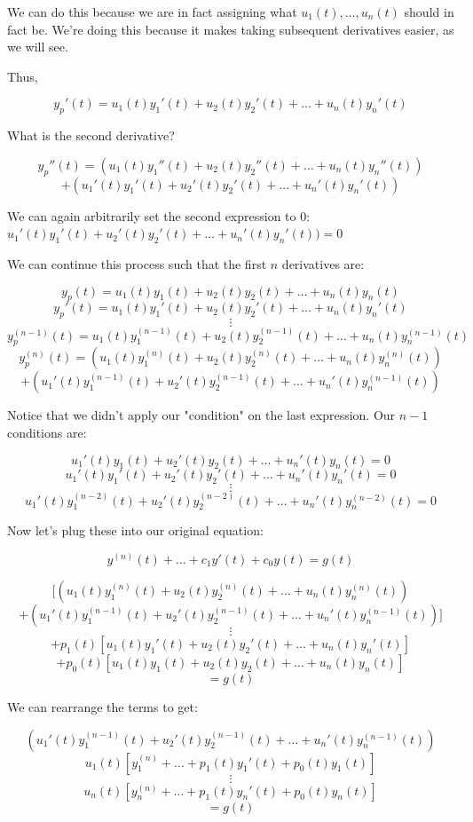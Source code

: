 \documentclass{report}
\begin{document}
We can do this because we are in fact assigning what $u_1(t), \dots, u_n(t)$ should in fact be. We're doing this because it makes taking subsequent derivatives easier, as we will see.

Thus,

$$y_p'(t) = u_1(t)y_1'(t) + u_2(t)y_2'(t) + \dots + u_n(t)y_n'(t)$$

What is the second derivative?

$$y_p''(t) = (u_1(t)y_1''(t) + u_2(t)y_2''(t) + \dots + u_n(t)y_n''(t))$$ 
$$ +  (u_1'(t)y_1'(t) + u_2'(t)y_2'(t) + \dots + u_n'(t)y_n'(t))$$

We can again arbitrarily set the second expression to 0:
$u_1'(t)y_1'(t) + u_2'(t)y_2'(t) + \dots + u_n'(t)y_n'(t)) = 0$

We can continue this process such that the first $n$ derivatives are:

$$y_p(t) = u_1(t)y_1(t) + u_2(t)y_2(t) + \dots + u_n(t)y_n(t)$$
$$y_p'(t) = u_1(t)y_1'(t) + u_2(t)y_2'(t) + \dots + u_n(t)y_n'(t)$$
$$\vdots$$
$$y_p^{(n-1)}(t) = u_1(t)y_1^{(n-1)}(t) + u_2(t)y_2^{(n-1)}(t) + \dots + u_n(t)y_n^{(n-1)}(t)$$
$$y_p^{(n)}(t) = (u_1(t)y_1^{(n)}(t) + u_2(t)y_2^{(n)}(t) + \dots + u_n(t)y_n^{(n)}(t))$$
$$+ (u_1'(t)y_1^{(n-1)}(t) + u_2'(t)y_2^{(n-1)}(t) + \dots + u_n'(t)y_n^{(n-1)}(t))$$

Notice that we didn't apply our "condition" on the last expression. Our $n-1$ conditions are:

$$u_1'(t)y_1(t) + u_2'(t)y_2(t) + \dots + u_n'(t)y_n(t) = 0$$
$$u_1'(t)y_1'(t) + u_2'(t)y_2'(t) + \dots + u_n'(t)y_n'(t) = 0$$
$$\vdots$$
$$u_1'(t)y_1^{(n-2)}(t) + u_2'(t)y_2^{(n-2)}(t) + \dots + u_n'(t)y_n^{(n-2)}(t) = 0$$


Now let's plug these into our original equation:

$$y^{(n)}(t) + \dots + c_1y'(t) + c_0y(t) = g(t)$$

$$[(u_1(t)y_1^{(n)}(t) + u_2(t)y_2^{(n)}(t) + \dots + u_n(t)y_n^{(n)}(t))$$
$$+ (u_1'(t)y_1^{(n-1)}(t) + u_2'(t)y_2^{(n-1)}(t) + \dots + u_n'(t)y_n^{(n-1)}(t))]$$
$$\vdots$$
$$+ p_1(t)[u_1(t)y_1'(t) + u_2(t)y_2'(t) + \dots + u_n(t)y_n'(t)]$$
$$+ p_0(t)[u_1(t)y_1(t) + u_2(t)y_2(t) + \dots + u_n(t)y_n(t)]$$
$$=g(t)$$

We can rearrange the terms to get:

$$(u_1'(t)y_1^{(n-1)}(t) + u_2'(t)y_2^{(n-1)}(t) + \dots + u_n'(t)y_n^{(n-1)}(t))$$
$$u_1(t)[y_1^{(n)} + \dots + p_1(t)y_1'(t) + p_0(t)y_1(t)]$$
$$\vdots$$
$$u_n(t)[y_n^{(n)} + \dots + p_1(t)y_n'(t) + p_0(t)y_n(t)]$$
$$=g(t)$$
\end{document}
